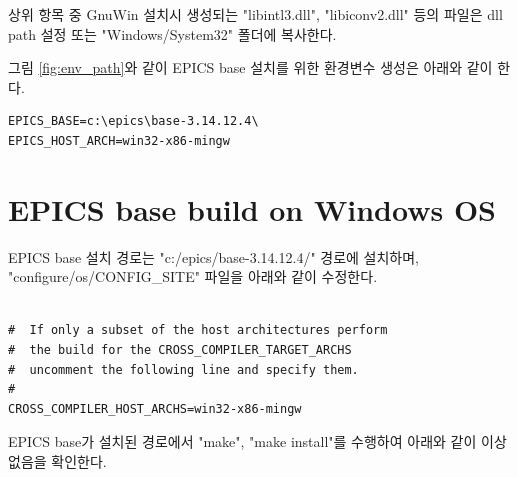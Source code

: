 \documentclass[11pt
  , a4paper
  , article
  , oneside
]{memoir}
\begin{document}
상위 항목 중 GnuWin 설치시 생성되는 "libintl3.dll", "libiconv2.dll" 등의 파일은 dll path 설정 또는 "Windows\//System32" 폴더에 복사한다.

그림 \ref{fig:env_path}와 같이 EPICS base 설치를 위한 환경변수 생성은 아래와 같이 한다.
\begin{lstlisting}[style=termstyle]
EPICS_BASE=c:\epics\base-3.14.12.4\
EPICS_HOST_ARCH=win32-x86-mingw
\end{lstlisting}

\chapter{EPICS base build on Windows OS}
EPICS base 설치 경로는 "c:/epics/base-3.14.12.4/" 경로에 설치하며, "configure/os/CONFIG\_SITE" 파일을 아래와 같이 수정한다.

\begin{lstlisting}[style=termstyle]

#  If only a subset of the host architectures perform
#  the build for the CROSS_COMPILER_TARGET_ARCHS
#  uncomment the following line and specify them.
#
CROSS_COMPILER_HOST_ARCHS=win32-x86-mingw 
\end{lstlisting}

EPICS base가 설치된 경로에서 "make", "make install"를 수행하여 아래와 같이 이상없음을 확인한다. 
\end{document}
